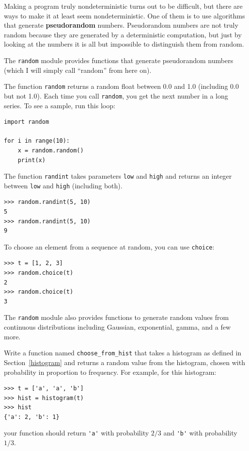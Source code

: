 \documentclass[10pt]{book}
\begin{document}
Making a program truly nondeterministic turns out to be difficult,
but there are ways to make it at least seem nondeterministic.  One of
them is to use algorithms that generate {\bf pseudorandom} numbers.
Pseudorandom numbers are not truly random because they are generated
by a deterministic computation, but just by looking at the numbers it
is all but impossible to distinguish them from random.

The {\tt random} module provides functions that generate
pseudorandom numbers (which I will simply call ``random'' from
here on).

The function {\tt random} returns a random float
between 0.0 and 1.0 (including 0.0 but not 1.0).  Each time you
call {\tt random}, you get the next number in a long series.  To see a
sample, run this loop:

\begin{verbatim}
import random

for i in range(10):
    x = random.random()
    print(x)
\end{verbatim}
%
The function {\tt randint} takes parameters {\tt low} and
{\tt high} and returns an integer between {\tt low} and
{\tt high} (including both).

\begin{verbatim}
>>> random.randint(5, 10)
5
>>> random.randint(5, 10)
9
\end{verbatim}
%
To choose an element from a sequence at random, you can use
{\tt choice}:

\begin{verbatim}
>>> t = [1, 2, 3]
>>> random.choice(t)
2
>>> random.choice(t)
3
\end{verbatim}
%
The {\tt random} module also provides functions to generate
random values from continuous distributions including
Gaussian, exponential, gamma, and a few more.

\begin{exercise}

Write a function named \verb"choose_from_hist" that takes
a histogram as defined in Section~\ref{histogram} and returns a 
random value from the histogram, chosen with probability
in proportion to frequency.  For example, for this histogram:

\begin{verbatim}
>>> t = ['a', 'a', 'b']
>>> hist = histogram(t)
>>> hist
{'a': 2, 'b': 1}
\end{verbatim}
%
your function should return \verb"'a'" with probability $2/3$ and \verb"'b'"
with probability $1/3$.
\end{exercise}
\end{document}
